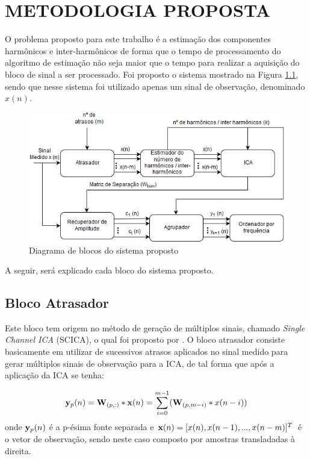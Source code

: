 \documentclass[a4paper,12pt]{monografia}
\theoremstyle{plain}
\theoremstyle{definition}
\theoremstyle{remark}
\begin{document}
 
\chapter{METODOLOGIA PROPOSTA}
\label{ch:mepro}

O problema proposto para este trabalho é a estimação dos componentes harmônicos e inter-harmônicos de forma que o tempo de processamento do algoritmo de estimação não seja maior que o tempo para realizar a aquisição do bloco de sinal a ser processado. Foi proposto o sistema mostrado na Figura \ref{fig:DigramaSistema}, sendo que nesse sistema foi utilizado apenas um sinal de observação, denominado $x(n)$.

\begin{figure}[!htb]
    \begin{center}
    \advance\leftskip-1cm
    \includegraphics[scale=0.6]{imagens/diagramasitemaproposto.jpg}
    \caption{Diagrama de blocos do sistema proposto}
    \label{fig:DigramaSistema}
    \end{center}
\end{figure}

A seguir, será explicado cada bloco do sistema proposto.

\section{Bloco Atrasador}

Este bloco tem origem no método de geração de múltiplos sinais, chamado \textit{Single Channel ICA} (SCICA), o qual foi proposto por \cite{davies2007source}. O bloco atrasador consiste basicamente em utilizar de sucessivos atrasos aplicados no sinal medido para gerar múltiplos sinais de observação para a ICA, de tal forma que após a aplicação da ICA se tenha:

\begin{equation}
    {{\bf {y}}_{p}}(n)= {\bf W}_{(p,:)}*{\bf{x}}(n)= \sum_{i=0}^{m-1}({\bf W}_{(p,m-i)}*{x}(n-i))
    \label{eq:SCICA}
\end{equation}
onde ${\bf {y}}_{p}(n)$ é a p-ésima fonte separada e ${\bf x}(n)=[x(n), x(n-1),..., x(n-m)]^T$ é o vetor de observação, sendo neste caso composto por amostras transladadas à direita. 
\end{document}
